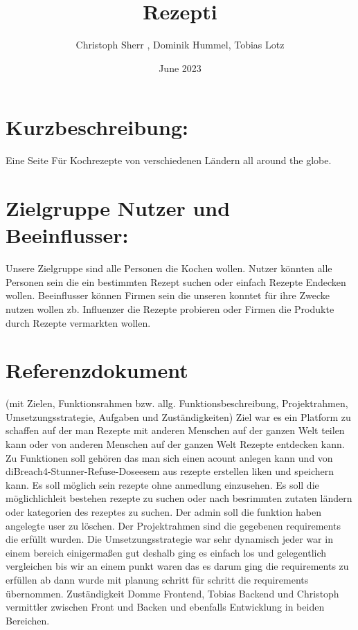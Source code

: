 \documentclass{report}
\title{Rezepti}
\author{ Christoph Sherr , Dominik Hummel, Tobias Lotz }
\date{June 2023}
\begin{document}
\maketitle

\section{Kurzbeschreibung:}
Eine Seite Für Kochrezepte von verschiedenen Ländern all around the globe.

\section{Zielgruppe Nutzer und Beeinflusser:}
Unsere Zielgruppe sind alle Personen die Kochen wollen. Nutzer könnten alle Personen sein die ein bestimmten Rezept suchen oder einfach Rezepte Endecken wollen. Beeinflusser können Firmen sein die unseren konntet für ihre Zwecke nutzen wollen zb. Influenzer die Rezepte probieren oder Firmen die Produkte durch Rezepte vermarkten wollen.

\section{Referenzdokument}
(mit Zielen, Funktionsrahmen bzw. allg. Funktionsbeschreibung, Projektrahmen, Umsetzungsstrategie, Aufgaben und Zuständigkeiten)
\newline\newline
Ziel war es ein Platform zu schaffen auf der man Rezepte mit anderen Menschen auf der ganzen Welt teilen kann oder von anderen Menschen auf der ganzen Welt Rezepte entdecken kann. 
\newline
Zu Funktionen soll gehören das man sich einen acount anlegen kann und von diBreach4-Stunner-Refuse-Doseesem aus rezepte erstellen liken und speichern kann. Es soll möglich sein rezepte ohne anmedlung einzusehen. Es soll die möglichlichleit bestehen rezepte zu suchen oder nach besrimmten zutaten ländern oder kategorien des rezeptes zu suchen. Der admin soll die funktion haben angelegte user zu löschen. 
\newline
Der Projektrahmen sind die gegebenen requirements die erfüllt wurden.
\newline
Die Umsetzungsstrategie war sehr dynamisch jeder war in einem bereich einigermaßen gut deshalb ging es einfach los und gelegentlich vergleichen bis wir an einem punkt waren das es darum ging die requirements zu erfüllen ab dann wurde mit planung schritt für schritt die requirements übernommen. 
\newline
Zuständigkeit Domme Frontend, Tobias Backend und Christoph vermittler zwischen Front und Backen und ebenfalls Entwicklung in beiden Bereichen.
\end{document}
